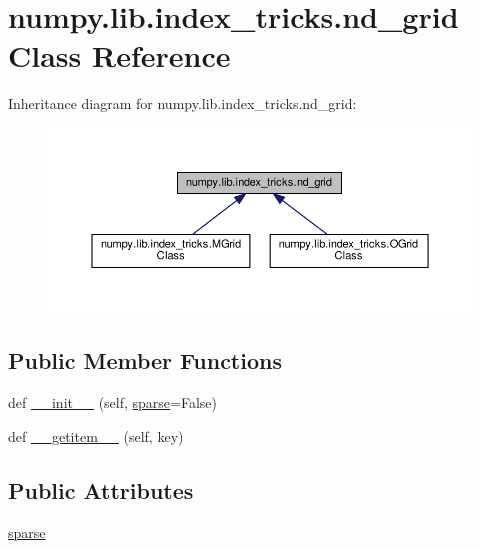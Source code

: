 \hypertarget{classnumpy_1_1lib_1_1index__tricks_1_1nd__grid}{}\section{numpy.\+lib.\+index\+\_\+tricks.\+nd\+\_\+grid Class Reference}
\label{classnumpy_1_1lib_1_1index__tricks_1_1nd__grid}


Inheritance diagram for numpy.\+lib.\+index\+\_\+tricks.\+nd\+\_\+grid\+:
\nopagebreak
\begin{figure}[H]
\begin{center}
\leavevmode
\includegraphics[width=350pt]{classnumpy_1_1lib_1_1index__tricks_1_1nd__grid__inherit__graph}
\end{center}
\end{figure}
\subsection*{Public Member Functions}
\begin{DoxyCompactItemize}
\item 
def \hyperlink{classnumpy_1_1lib_1_1index__tricks_1_1nd__grid_a8d1b5d244d2aacfd699fec7f23d5fa94}{\+\_\+\+\_\+init\+\_\+\+\_\+} (self, \hyperlink{classnumpy_1_1lib_1_1index__tricks_1_1nd__grid_a390a2fd914a0d6b8092ab3855a3af857}{sparse}=False)
\item 
def \hyperlink{classnumpy_1_1lib_1_1index__tricks_1_1nd__grid_ab10c8d0852f61f736080a8e695463f61}{\+\_\+\+\_\+getitem\+\_\+\+\_\+} (self, key)
\end{DoxyCompactItemize}
\subsection*{Public Attributes}
\begin{DoxyCompactItemize}
\item 
\hyperlink{classnumpy_1_1lib_1_1index__tricks_1_1nd__grid_a390a2fd914a0d6b8092ab3855a3af857}{sparse}
\end{DoxyCompactItemize}


